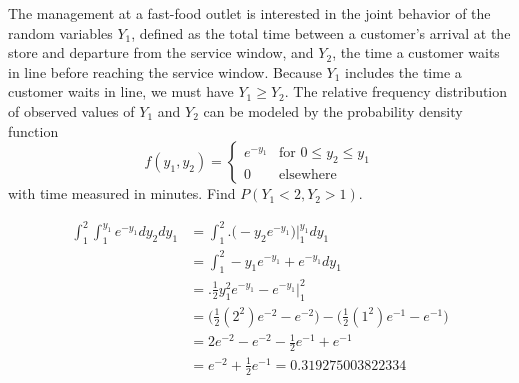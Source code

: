 \documentclass[answers]{exam}
\begin{document}
\begin{questions}
\question 
The management at a fast-food outlet is interested in the joint behavior of the random variables $Y_1$, defined as the total time between a customer’s arrival at the store and departure from the service window, and $Y_2$, the time a customer waits in line before reaching the service window. Because $Y_1$ includes the time a customer waits in line, we must have $Y_1\geq Y_2$. The relative frequency distribution of observed values of $Y_1$ and $Y_2$ can be modeled by the probability density function
$$ f(y_1,y_2)=\begin{cases} e^{-y_1} & \text{for } 0\leq y_2\leq y_1 \\
	0 & \text{elsewhere} \end{cases} $$
with time measured in minutes. Find $P(Y_1<2,Y_2>1)$.
\begin{solution}
	\begin{align*}
		\int_{1}^{2}\int_{1}^{y_1}e^{-y_1}dy_2dy_1 
		&= \int_{1}^{2}\bigg.\bigg(-y_2e^{-y_1}\bigg)\bigg|_1^{y_1} dy_1 \\
		&= \int_{1}^{2} -y_1e^{-y_1} + e^{-y_1} dy_1 \\
		&= \bigg. \frac{1}{2}y_1^2e^{-y_1}-e^{-y_1} \bigg|_1^2 \\
		&= \bigg(\frac{1}{2}(2^2)e^{-2}-e^{-2}\bigg)-\bigg(\frac{1}{2}(1^2)e^{-1}-e^{-1}\bigg) \\
		&= 2e^{-2}-e^{-2}-\frac{1}{2}e^{-1}+e^{-1} \\
		&= e^{-2}+\frac{1}{2}e^{-1}
		= 0.319275003822334
	\end{align*}
\end{solution}

	
\setcounter{question}{9}


\end{questions}
\end{document}
